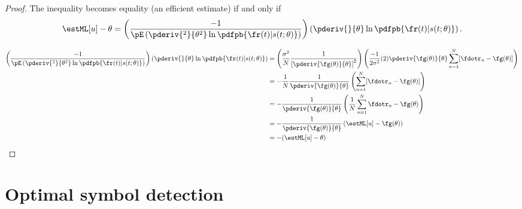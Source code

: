 \begin{proof}
The inequality becomes equality (an efficient estimate)
if and only if
\[ \estML[u] - \theta =
   \left( \frac{-1}{\pE\left(
              \pderiv{^2}{\theta^2} \ln \pdfpb{\fr(t)|s(t;\theta)}
           \right)} \right)
   \left(\pderiv{}{\theta} \ln \pdfpb{\fr(t)|s(t;\theta)} \right).
\]

\begin{align*}
   \left( \frac{-1}{\pE\left(
              \pderiv{^2}{\theta^2} \ln \pdfpb{\fr(t)|s(t;\theta)}
           \right)} \right)
   \left(\pderiv{}{\theta} \ln \pdfpb{\fr(t)|s(t;\theta)} \right)
     &= \left(
         \frac{\sigma^2}{N}
           \frac{1}{\left[ \pderiv{\fg(\theta)}{\theta} \right]^2} \right)
         \left(\frac{-1}{2\sigma^2}(2)\pderiv{\fg(\theta)}{\theta}
         \sum_{n=1}^N [\fdotr_n - \fg(\theta) ]\right)
   \\&= -\frac{1}{N}
         \frac{1}{\pderiv{\fg(\theta)}{\theta}}
         \left(\sum_{n=1}^N [\fdotr_n - \fg(\theta) ] \right)
   \\&= -\frac{1}{\pderiv{\fg(\theta)}{\theta}}
         \left(\frac{1}{N}\sum_{n=1}^N \fdotr_n - \fg(\theta) \right)
   \\&= -\frac{1}{\pderiv{\fg(\theta)}{\theta}}
         \left(\estML[u] - \fg(\theta) \right)
   \\&= -(\estML[u] - \theta)
\end{align*}
\end{proof}



\section{Optimal symbol detection}
